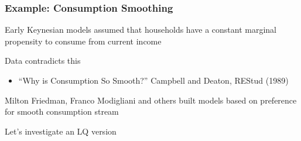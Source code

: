 \begin{frame}
    \frametitle{Example: Consumption Smoothing}
    
        \vspace{0.5em}
    Early Keynesian models assumed that households have a constant marginal
    propensity to consume from current income
    
        \vspace{0.5em}
    Data contradicts this
    
    \begin{itemize}
        \item ``Why is Consumption So Smooth?'' Campbell and Deaton, REStud (1989)
    \end{itemize}
    
        \vspace{0.5em}
        \vspace{0.5em}
    Milton Friedman, Franco Modigliani and others built models based on
    preference for smooth consumption stream 

        \vspace{0.5em}
    Let's investigate an LQ version

\end{frame}



